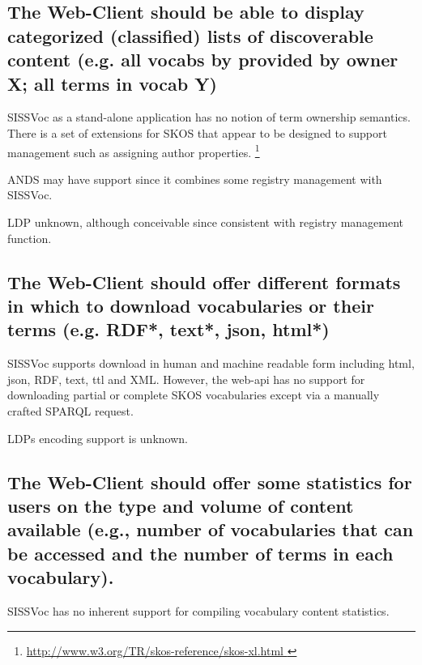 \documentclass[10pt,a4paper]{article}
\begin{document}
\begin{flushleft}

\subsection{ The Web-Client should be able to display categorized
(classified) lists of discoverable content (e.g. all vocabs by provided by
owner X; all terms in vocab Y) }


  \item[] SISSVoc as a stand-alone application has no notion of term ownership semantics. There is
  a set of extensions for SKOS that appear to be designed to support management such as 
  assigning author properties. 
  \footnote  { \url { http://www.w3.org/TR/skos-reference/skos-xl.html } }    

  \item[] ANDS may have support since it combines some registry management with SISSVoc. 

  \item LDP unknown, although conceivable since consistent with registry management function.


\subsection{ The Web-Client should offer different formats in which to
download vocabularies or their terms (e.g. RDF*, text*, json, html*) }

  \item SISSVoc supports download in human and machine readable form including html, 
  json, RDF, text, ttl and XML. However, the web-api has no support for downloading 
  partial or complete SKOS vocabularies except via a manually crafted SPARQL request.

  \item LDPs encoding support is unknown.

\subsection{ The Web-Client should offer some statistics for users on the
type and volume of content available (e.g., number of vocabularies that can be
accessed and the number of terms in each vocabulary).  }
 

  \item SISSVoc has no inherent support for compiling vocabulary content statistics.


\end{flushleft}
\end{document}
